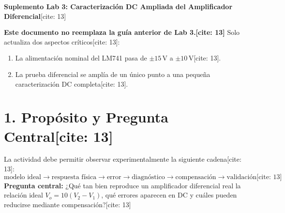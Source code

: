 \documentclass[11pt, a4paper]{article}
\begin{document}
\begin{center}
    \Large\textbf{\textcolor{ucbblue}{Suplemento Lab 3: Caracterización DC Ampliada del Amplificador Diferencial}}[cite: 13]
\end{center}

\begin{tcolorbox}[colback=yellow!10, colframe=ucbblue, title=\textbf{Aviso Importante}]
    \textbf{Este documento no reemplaza la guía anterior de Lab 3.[cite: 13]} Solo actualiza dos aspectos críticos[cite: 13]:
    \begin{enumerate}
        \item La alimentación nominal del LM741 pasa de $\pm15\,\text{V}$ a $\pm10\,\text{V}$[cite: 13].
        \item La prueba diferencial se amplía de un único punto a una pequeña caracterización DC completa[cite: 13].
    \end{enumerate}
\end{tcolorbox}

\section*{1. Propósito y Pregunta Central[cite: 13]}
La actividad debe permitir observar experimentalmente la siguiente cadena[cite: 13]:
\begin{equation*}
    \text{modelo ideal} \rightarrow \text{respuesta física} \rightarrow \text{error} \rightarrow \text{diagnóstico} \rightarrow \text{compensación} \rightarrow \text{validación} \text{[cite: 13]}
\end{equation*}
\textbf{Pregunta central:} ¿Qué tan bien reproduce un amplificador diferencial real la relación ideal $V_o=10(V_2-V_1)$, qué errores aparecen en DC y cuáles pueden reducirse mediante compensación?[cite: 13]
\end{document}
